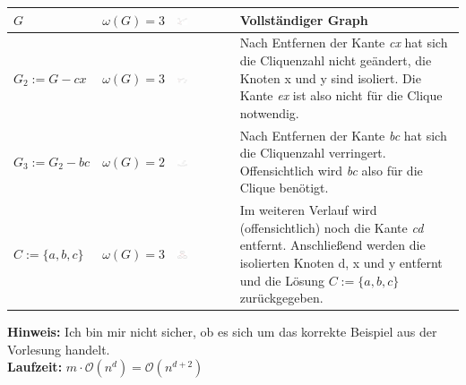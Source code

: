 \documentclass{article} %
\begin{document}
\begin{table}[h]
\centering
\begin{tabular}{|l|l|l|p{8cm}|}
\hline
$G$ &  $\omega (G) = 3$ & \includegraphics[width=0.2\textwidth,trim=0 0 0 -5]{img/clique1.png} &   Vollständiger Graph \\ \hline
$G_2 := G - cx$ &  $\omega (G) = 3$ & \includegraphics[width=0.2\textwidth,trim=0 0 0 -5]{img/clique2.png} & Nach Entfernen der Kante \emph{cx} hat sich die Cliquenzahl nicht geändert, die Knoten x und y sind isoliert.
Die Kante \emph{ex} ist also nicht für die Clique notwendig. \\ \hline
$G_3 := G_2 - bc $  & $\omega (G) = 2$  & \includegraphics[width=0.2\textwidth,trim=0 0 0 -5]{img/clique4.png} & Nach Entfernen der Kante \emph{bc} hat sich die Cliquenzahl verringert.
 Offensichtlich wird \emph{bc} also für die Clique benötigt. \\ \hline
$C := \{a,b,c\} $  & $\omega (G) = 3$  & \includegraphics[width=0.2\textwidth,trim=0 0 0 -5]{img/clique3.png} & Im weiteren Verlauf wird (offensichtlich) noch die Kante \emph{cd} entfernt. Anschließend werden die isolierten Knoten d, x und y entfernt und die Lösung $C := \{a,b,c\}$ zurückgegeben.\\ \hline
\end{tabular}
\end{table}

\textbf{Hinweis:} Ich bin mir nicht sicher, ob es sich um das korrekte Beispiel aus der Vorlesung handelt.\\

\textbf{Laufzeit:} $m \cdot \mathcal{O}(n^d) = \mathcal{O}(n^{d+2})$
\end{document}
